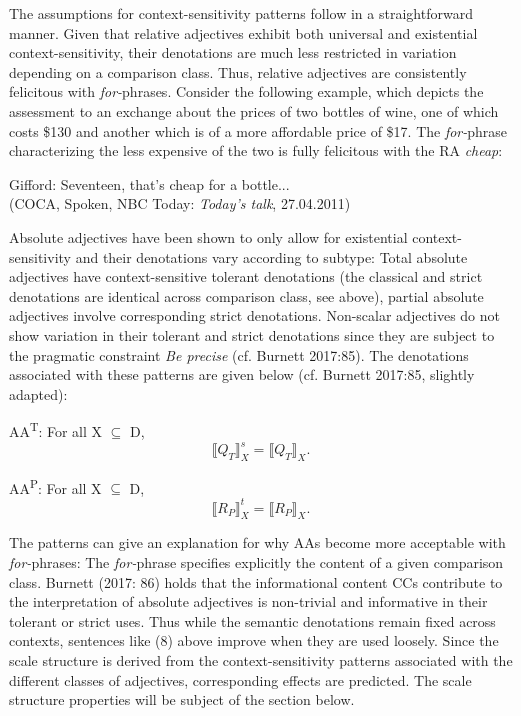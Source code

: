 \documentclass[output=paper
,modfonts
,nonflat]{langsci/langscibook}
\begin{document}
The assumptions for context-sensitivity patterns follow in a straightforward manner. Given that relative adjectives exhibit both universal and existential context-sensitivity, their denotations are much less restricted in variation depending on a comparison class. Thus, relative adjectives are consistently felicitous with \textit{for-}phrases. Consider the following example, which depicts the assessment to an exchange about the prices of two bottles of wine, one of which costs \$130 and another which is of a more affordable price of \$17. The  \textit{for-}phrase characterizing the less expensive of the two is fully felicitous with the RA  \textit{cheap}: 

\begin{examples}
	\item Gifford: Seventeen, that's cheap for a bottle... \\ (COCA, Spoken, NBC Today: \textit{Today's talk}, 27.04.2011)
\end{examples}
	
Absolute adjectives have been shown to only allow for existential context-sensitivity and their denotations vary according to subtype: Total absolute adjectives have context-sensitive tolerant denotations (the classical and strict denotations are identical across comparison class, see above), partial absolute adjectives involve corresponding strict denotations. Non-scalar adjectives do not show variation in their tolerant and strict denotations since they are subject to the pragmatic constraint \textit{Be precise} (cf. Burnett 2017:85). The denotations associated with these patterns are given below (cf. Burnett 2017:85, slightly adapted):

\begin{examples}
	\item AA\textsuperscript{T}: For all X $\subseteq$ D, \[ \llbracket Q_{T} \rrbracket_X^s = \llbracket Q_{T}\rrbracket_{X}\text{.}\]
	\item AA\textsuperscript{P}: For all X $\subseteq$ D, \[\llbracket R_{P}\rrbracket_X^t = \llbracket R_{P}\rrbracket_{X}\text{.}\]
\end{examples}

The patterns can give an explanation for why AAs become more acceptable with  \textit{for-}phrases: The  \textit{for-}phrase specifies explicitly the content of a given comparison class. Burnett (2017: 86) holds that the informational content CCs contribute to the interpretation of absolute adjectives is non-trivial and informative in their tolerant or strict uses. Thus while the semantic denotations remain fixed across contexts, sentences like (8) above improve when they are used loosely.
Since the scale structure is derived from the context-sensitivity patterns associated with the different classes of adjectives, corresponding effects are predicted. The scale structure properties will be subject of the section below.
\end{document}
